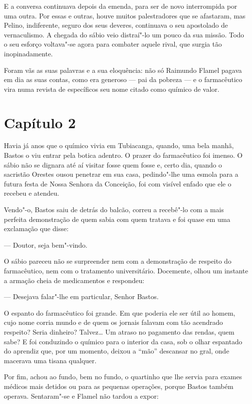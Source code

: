 E a conversa continuava depois da emenda, para ser de novo interrompida
por uma outra. Por essas e outras, houve muitos palestradores que se
afastaram, mas Pelino, indiferente, seguro dos seus deveres, continuava
o seu apostolado de vernaculismo. A chegada do sábio veio distraí"-lo um
pouco da sua missão. Todo o seu esforço voltava"-se agora para combater
aquele rival, que surgia tão inopinadamente.

Foram vãs as suas palavras e a sua eloquência: não só Raimundo Flamel
pagava em dia as suas contas, como era generoso --- pai da pobreza --- e
o farmacêutico vira numa revista de específicos seu nome citado como
químico de valor.

\section*{Capítulo 2}

Havia já anos que o químico vivia em Tubiacanga, quando, uma bela manhã,
Bastos o viu entrar pela botica adentro. O prazer do farmacêutico foi
imenso. O sábio não se dignara até aí visitar fosse quem fosse e, certo
dia, quando o sacristão Orestes ousou penetrar em sua casa, pedindo"-lhe
uma esmola para a futura festa de Nossa Senhora da Conceição, foi com
visível enfado que ele o recebeu e atendeu.

Vendo"-o, Bastos saiu de detrás do balcão, correu a recebê"-lo com a mais
perfeita demonstração de quem sabia com quem tratava e foi quase em uma
exclamação que disse:

--- Doutor, seja bem"-vindo.

O sábio pareceu não se surpreender nem com a demonstração de respeito do
farmacêutico, nem com o tratamento universitário. Docemente, olhou um
instante a armação cheia de medicamentos e respondeu:

--- Desejava falar"-lhe em particular, Senhor Bastos.

O espanto do farmacêutico foi grande. Em que poderia ele ser útil ao
homem, cujo nome corria mundo e de quem os jornais falavam com tão
acendrado respeito? Seria dinheiro? Talvez\ldots{} Um atraso no pagamento das
rendas, quem sabe? E foi conduzindo o químico para o interior da casa,
sob o olhar espantado do aprendiz que, por um momento, deixou a ``mão''
descansar no gral, onde macerava uma tisana qualquer.

Por fim, achou ao fundo, bem no fundo, o quartinho que lhe servia para
exames médicos mais detidos ou para as pequenas operações, porque Bastos
também operava. Sentaram"-se e Flamel não tardou a expor:

